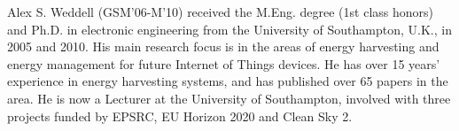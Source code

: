 \documentclass[journal, twoside]{IEEEtran}
\begin{document}
\begin{IEEEbiography}{Alex S. Weddell}
(GSM’06-M’10) received the M.Eng. degree (1st class honors) and Ph.D. in electronic engineering from the University of Southampton, U.K., in 2005 and 2010. His main research focus is in the areas of energy harvesting and energy management for future Internet of Things devices.
He has over 15 years’ experience in energy harvesting systems, and has published over 65 papers in the area. 
He is now a Lecturer at the University of Southampton, involved with three projects funded by EPSRC, EU Horizon 2020 and Clean Sky 2.
\end{IEEEbiography}





\end{document}
